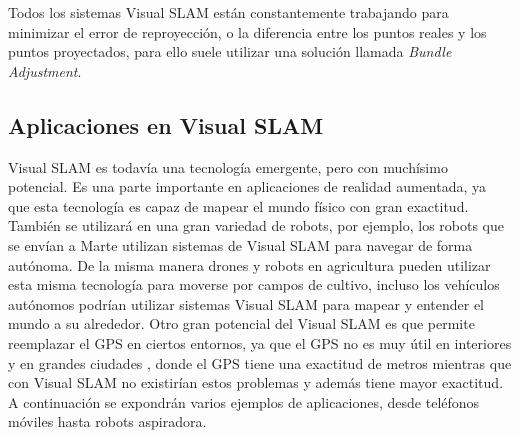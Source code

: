 Todos los sistemas Visual SLAM están constantemente trabajando para minimizar el error de reproyección, o la diferencia entre los puntos reales y los puntos proyectados, para ello suele utilizar una solución llamada \textit{Bundle Adjustment}.




\subsection{Aplicaciones en Visual SLAM} 

Visual SLAM es todavía una tecnología emergente, pero con muchísimo potencial. Es una parte importante en aplicaciones de realidad aumentada, ya que esta tecnología es capaz de mapear el mundo físico con gran exactitud. También se utilizará en una gran variedad de robots, por ejemplo, los robots que se envían a Marte utilizan sistemas de Visual SLAM para navegar de forma autónoma. De la misma manera drones y robots en agricultura pueden utilizar esta misma tecnología para moverse por campos de cultivo, incluso los vehículos autónomos podrían utilizar sistemas Visual SLAM para mapear y entender el mundo a su alrededor. Otro gran potencial del Visual SLAM es que permite reemplazar el GPS en ciertos entornos, ya que el GPS no es muy útil en interiores y en grandes ciudades , donde el GPS tiene una exactitud de metros mientras que con Visual SLAM no existirían estos problemas y además tiene mayor exactitud.
A continuación se expondrán varios ejemplos de aplicaciones, desde teléfonos móviles hasta robots aspiradora.
